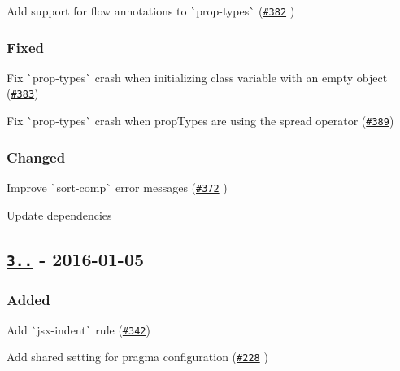 \begin{DoxyItemize}
\item Add support for flow annotations to \`{}prop-\/types\`{} (\href{https://github.com/yannickcr/eslint-plugin-react/pull/382}{\tt \#382} )
\end{DoxyItemize}

\subsubsection*{Fixed}


\begin{DoxyItemize}
\item Fix \`{}prop-\/types\`{} crash when initializing class variable with an empty object (\href{https://github.com/yannickcr/eslint-plugin-react/issues/383}{\tt \#383})
\item Fix \`{}prop-\/types\`{} crash when prop\+Types are using the spread operator (\href{https://github.com/yannickcr/eslint-plugin-react/issues/389}{\tt \#389})
\end{DoxyItemize}

\subsubsection*{Changed}


\begin{DoxyItemize}
\item Improve \`{}sort-\/comp\`{} error messages (\href{https://github.com/yannickcr/eslint-plugin-react/pull/372}{\tt \#372} )
\item Update dependencies
\end{DoxyItemize}

\subsection*{\href{https://github.com/yannickcr/eslint-plugin-react/compare/v3.13.1...v3.14.0}{\tt 3..} -\/ 2016-\/01-\/05}

\subsubsection*{Added}


\begin{DoxyItemize}
\item Add \`{}jsx-\/indent\`{} rule (\href{https://github.com/yannickcr/eslint-plugin-react/issues/342}{\tt \#342})
\item Add shared setting for pragma configuration (\href{https://github.com/yannickcr/eslint-plugin-react/issues/228}{\tt \#228} )
\end{DoxyItemize}

